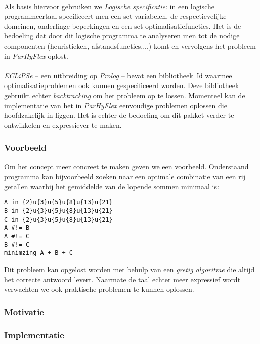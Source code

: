 \paragraph{}
Als basis hiervoor gebruiken we \emph{Logische specificatie}: in een logische programmeertaal specificeert men een set variabelen, de respectievelijke domeinen, onderlinge beperkingen en een set optimalisatiefuncties. Het is de bedoeling dat door dit logische programma te analyseren men tot de nodige componenten (heuristieken, afstandsfuncties,...) komt en vervolgens het probleem in \emph{ParHyFlex} oplost.

\paragraph{}
\emph{ECLiPSe} -- een uitbreiding op \emph{Prolog} -- bevat een bibliotheek \texttt{fd} waarmee optimalisatieproblemen ook kunnen gespecificeerd worden. Deze bibliotheek gebruikt echter \emph{backtracking} om het probleem op te lossen. Momenteel kan de implementatie van het  in \emph{ParHyFlex} eenvoudige problemen oplossen die hoofdzakelijk in  liggen. Het is echter de bedoeling om dit pakket verder te ontwikkelen en expressiever te maken.

\subsubsection{Voorbeeld}

Om het concept meer concreet te maken geven we een voorbeeld. Onderstaand programma kan bijvoorbeeld zoeken naar een optimale combinatie van een rij getallen waarbij het gemiddelde van de lopende sommen minimaal is:

\begin{verbatim}
A in {2}u{3}u{5}u{8}u{13}u{21}
B in {2}u{3}u{5}u{8}u{13}u{21}
C in {2}u{3}u{5}u{8}u{13}u{21}
A #!= B
A #!= C
B #!= C
minimzing A + B + C
\end{verbatim}
Dit probleem kan opgelost worden met behulp van een \emph{gretig algoritme} die altijd het correcte antwoord levert. Naarmate de taal echter meer expressief wordt verwachten we ook praktische problemen te kunnen oplossen.

\subsubsection{Motivatie}

\subsubsection{Implementatie}

